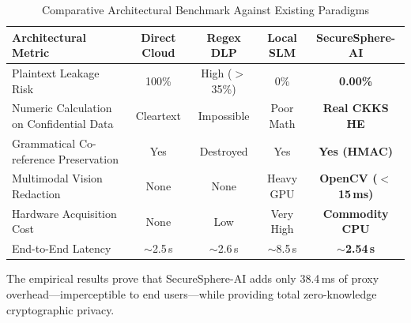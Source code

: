 \begin{table}[htbp]
\centering
\caption{Comparative Architectural Benchmark Against Existing Paradigms}\label{tab:comparison}
\begin{tabular}{p{}cccc}
\toprule
\textbf{Architectural Metric} & \textbf{Direct Cloud} & \textbf{Regex DLP} & \textbf{Local SLM} & \textbf{SecureSphere-AI} \\
\midrule
Plaintext Leakage Risk & 100\% & High ($>$35\%) & 0\% & \textbf{0.00\%} \\
Numeric Calculation on Confidential Data & Cleartext & Impossible & Poor Math & \textbf{Real CKKS HE} \\
Grammatical Co-reference Preservation & Yes & Destroyed & Yes & \textbf{Yes (HMAC)} \\
Multimodal Vision Redaction & None & None & Heavy GPU & \textbf{OpenCV ($<$15\,ms)} \\
Hardware Acquisition Cost & None & Low & Very High & \textbf{Commodity CPU} \\
End-to-End Latency & $\sim$2.5\,s & $\sim$2.6\,s & $\sim$8.5\,s & \textbf{$\sim$2.54\,s} \\
\bottomrule
\end{tabular}
\end{table}
The empirical results prove that SecureSphere-AI adds only 38.4\,ms of proxy overhead—imperceptible to end users—while providing total zero-knowledge cryptographic privacy.
